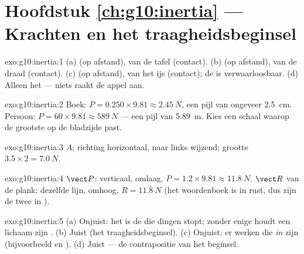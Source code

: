 \section*{Hoofdstuk \ref{ch:g10:inertia} --- Krachten en het traagheidsbeginsel}

\begin{solution}{exo:g10:inertia:1}
(a)  (op afstand),  van de tafel (contact).
(b)  (op afstand),  van de draad (contact).
(c)  (op afstand),  van het ijs (contact); de
 is verwaarloosbaar. (d) Alleen het  --- niets raakt de
appel aan.
\end{solution}

\begin{solution}{exo:g10:inertia:2}
Boek: $P = 0.250 \times 9.81 \approx \qty{2.45}{N}$, een pijl van
ongeveer \qty{2.5}{cm}. Persoon: $P = 60 \times 9.81 \approx
\qty{589}{N}$ --- een pijl van \qty{5.89}{m}. Kies een schaal waarop de
grootste  op de bladzijde past.
\end{solution}

\begin{solution}{exo:g10:inertia:3}
 $A$; richting horizontaal, naar links wijzend; grootte
$3.5 \times 2 = \qty{7.0}{N}$.
\end{solution}

\begin{solution}{exo:g10:inertia:4}
 $\vect P$: verticaal, omlaag,
$P = 1.2 \times 9.81 \approx \qty{11.8}{N}$.  $\vect R$ van
de plank: dezelfde lijn, omhoog, $R = \qty{11.8}{N}$ (het woordenboek is
in rust, dus zijn de twee in ).
\end{solution}

\begin{solution}{exo:g10:inertia:5}
(a) Onjuist: het is de  die dingen stopt; zonder enige 
houdt een lichaam zijn . (b) Juist (het
traagheidsbeginsel). (c) Onjuist: er werken  die \emph{in
} zijn (bijvoorbeeld  en ). (d) Juist ---
de contrapositie van het beginsel.
\end{solution}

